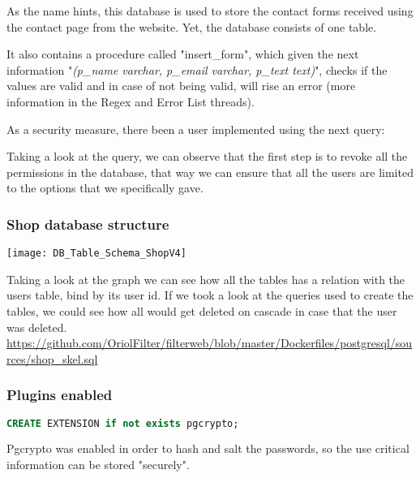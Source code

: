 \begin{flushleft}
    As the name hints, this database is used to store the contact forms received using the contact page from the website.
    Yet, the database consists of one table.
\end{flushleft}
\begin{flushleft}
    It also contains a procedure called "insert\_form", which given the next information "\textit{(p\_name varchar,
    p\_email varchar, p\_text text)}", checks if the values are valid and in case of not being valid, will rise an error
    (more information in the Regex and Error List threads).
\end{flushleft}
\begin{flushleft}
    As a security measure, there been a user implemented using the next query:
    
\end{flushleft}
\begin{flushleft}
    Taking a look at the query, we can observe that the first step is to revoke all the permissions in the database,
    that way we can ensure that all the users are limited to the options that we specifically gave.
\end{flushleft}


\newpage
\subsubsection[Shop database structure]{Shop database structure}
\begin{center}
    \texttt{[image: DB\_Table\_Schema\_ShopV4]}
\end{center}
\begin{flushleft}
    Taking a look at the graph we can see how all the tables has a relation with the users table, bind by its user id.
    If we took a look at the queries used to create the tables, we could see how all would get deleted on cascade in case
    that the user was deleted.
    \url{https://github.com/OriolFilter/filterweb/blob/master/Dockerfiles/postgresql/sources/shop_skel.sql}
\end{flushleft}


\subsubsection[Plugins enabled]{Plugins enabled}
\begin{lstlisting}[language=SQL,label={lst:pgcrypto_enabling}]
CREATE EXTENSION if not exists pgcrypto;
\end{lstlisting}
\begin{flushleft}
    Pgcrypto was enabled in order to hash and salt the passwords, so the use critical information can be stored "securely".
\end{flushleft}


